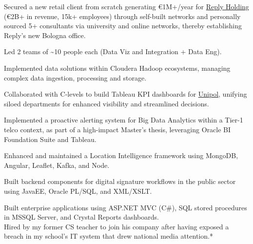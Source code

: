 \documentclass[]{deedy-resume-cv}
\begin{document}
\begin{minipage}[t]{0.60\textwidth}
\sectionsep
{}
\begin{tightemize}
\item Secured a new retail client from scratch generating €1M+/year for \href{https://www.reply.com}{Reply Holding} (€2B+ in revenue, 15k+ employees) through self-built networks and personally sourced 5+ consultants via university and online networks, thereby establishing Reply's new Bologna office.

\item Led 2 teams of \~{}10 people each (Data Viz and Integration + Data Eng).

\item Implemented data solutions within Cloudera Hadoop ecosystems, managing complex data ingestion, processing and storage.

\item Collaborated with C-levels to build Tableau KPI dashboards for \href{https://www.unipol.it/}{Unipol}, unifying siloed departments for enhanced visibility and streamlined decisions.
\end{tightemize}

\sectionsep
{}
\begin{tightemize}
\item Implemented a proactive alerting system for Big Data Analytics within a Tier-1 telco context, as part of a high-impact Master's thesis, leveraging Oracle BI Foundation Suite and Tableau.
\item Enhanced and maintained a Location Intelligence framework using MongoDB, Angular, Leaflet, Kafka, and Node. 
\end{tightemize}

\sectionsep
{}
Built backend components for digital signature workflows in the public sector using JavaEE, Oracle PL/SQL, and XML/XSLT.

\sectionsep
{}
Built enterprise applications using ASP.NET MVC (C\#), SQL stored procedures in MSSQL Server, and Crystal Reports dashboards.\\
\vspace{1pt}
Hired by my former CS teacher to join his company after having exposed a breach in my school's IT system that drew national media attention.*

%
%
\end{minipage}
\end{document}
